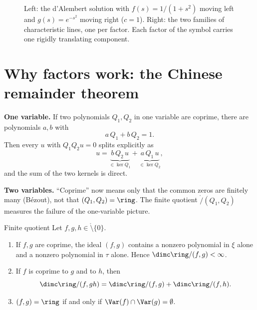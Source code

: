 \begin{figure}[!htb]
\centering
{}
\hfill
{}
\caption{Left: the d'Alembert solution with $f(s)=1/(1+s^2)$ moving left and $g(s)=e^{-s^2}$ moving right ($c=1$). Right: the two families of characteristic lines, one per factor. Each factor of the symbol carries one rigidly translating component.}\label{fig:wave}
\end{figure}

\section{Why factors work: the Chinese remainder theorem}

\textbf{One variable.} If two polynomials $Q_1,Q_2$ in one variable are coprime, there are polynomials $a,b$ with
\[
a\,Q_1+b\,Q_2=1 .
\]
Then every $u$ with $Q_1Q_2u=0$ splits explicitly as
\[
u=\underbrace{b\,Q_2\,u}_{\in\ker Q_1}+\underbrace{a\,Q_1\,u}_{\in\ker Q_2},
\]
and the sum of the two kernels is direct.

\textbf{Two variables.} ``Coprime'' now means only that the common zeros are finitely many (B\'ezout), not that $(Q_1,Q_2)=\ring$. The finite quotient $\ring/(Q_1,Q_2)$ measures the failure of the one-variable picture.

\begin{lemma}{Finite quotient  \proved}\label{lem:C12L3}
Let $f,g,h\in\ring\setminus\{0\}$.
\begin{enumerate}[label=(\alph*)]
\item If $f,g$ are coprime, the ideal $(f,g)$ contains a nonzero polynomial in $\xi$ alone and a nonzero polynomial in $\tau$ alone. Hence $\dimc\ring/(f,g)<\infty$.
\item If $f$ is coprime to $g$ and to $h$, then
\[
\dimc\ring/(f,gh)=\dimc\ring/(f,g)+\dimc\ring/(f,h).
\]
\item $(f,g)=\ring$ if and only if $\Var(f)\cap\Var(g)=\emptyset$.
\end{enumerate}
\end{lemma}

